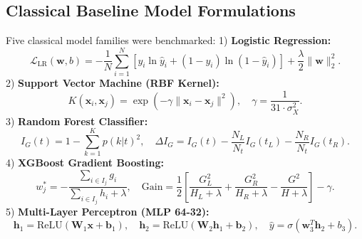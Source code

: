 \documentclass{ieeeaccess}
\begin{document}
\subsection{Classical Baseline Model Formulations}
Five classical model families were benchmarked:
1) \textbf{Logistic Regression:}
\begin{equation}
\mathcal{L}_{\text{LR}}(\mathbf{w}, b) = -\frac{1}{N}\sum_{i=1}^N \left[ y_i \ln \hat{y}_i + (1 - y_i)\ln(1 - \hat{y}_i) \right] + \frac{\lambda}{2} \|\mathbf{w}\|_2^2.
\end{equation}
2) \textbf{Support Vector Machine (RBF Kernel):}
\begin{equation}
K(\mathbf{x}_i, \mathbf{x}_j) = \exp\left(-\gamma \|\mathbf{x}_i - \mathbf{x}_j\|^2\right), \quad \gamma = \frac{1}{31 \cdot \sigma_X^2}.
\end{equation}
3) \textbf{Random Forest Classifier:}
\begin{equation}
I_G(t) = 1 - \sum_{k=1}^K p(k|t)^2, \quad \Delta I_G = I_G(t) - \frac{N_L}{N_t}I_G(t_L) - \frac{N_R}{N_t}I_G(t_R).
\end{equation}
4) \textbf{XGBoost Gradient Boosting:}
\begin{equation}
w_j^* = -\frac{\sum_{i \in I_j} g_i}{\sum_{i \in I_j} h_i + \lambda}, \quad \text{Gain} = \frac{1}{2}\left[ \frac{G_L^2}{H_L + \lambda} + \frac{G_R^2}{H_R + \lambda} - \frac{G^2}{H + \lambda} \right] - \gamma.
\end{equation}
5) \textbf{Multi-Layer Perceptron (MLP 64-32):}
\begin{equation}
\mathbf{h}_1 = \text{ReLU}(\mathbf{W}_1 \mathbf{x} + \mathbf{b}_1), \quad \mathbf{h}_2 = \text{ReLU}(\mathbf{W}_2 \mathbf{h}_1 + \mathbf{b}_2), \quad \hat{y} = \sigma(\mathbf{w}_3^T \mathbf{h}_2 + b_3).
\end{equation}
\end{document}
